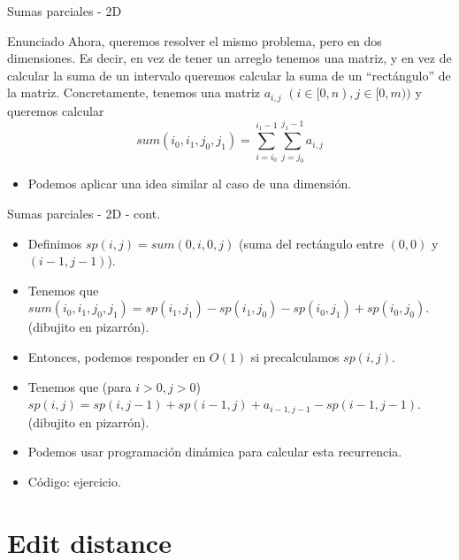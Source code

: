 \documentclass{beamer}
\begin{document}
\begin{frame}{Sumas parciales - 2D}
\begin{block}{Enunciado}
Ahora, queremos resolver el mismo problema, pero en dos dimensiones. Es decir, en vez de tener un arreglo tenemos una matriz, y en vez de calcular la suma de un intervalo queremos calcular la suma de un ``rect\'angulo'' de la matriz. Concretamente, tenemos una matriz $a_{i,j}$ $(i \in [0,n), j \in [0,m))$ y queremos calcular $$sum(i_0,i_1,j_0,j_1) = \sum_{i=i_0}^{i_1-1}\sum_{j=j_0}^{j_1-1} a_{i,j}$$
\end{block}
\begin{itemize}
\item
Podemos aplicar una idea similar al caso de una dimensi\'on.
\end{itemize}
\end{frame}

\begin{frame}{Sumas parciales - 2D - cont.}
\begin{itemize}
\item
Definimos $sp(i,j) = sum(0,i,0,j)$ (suma del rect\'angulo entre $(0,0)$ y $(i-1,j-1)$).
\item
Tenemos que $sum(i_0,i_1,j_0,j_1) = sp(i_1,j_1)-sp(i_1,j_0)-sp(i_0,j_1)+sp(i_0,j_0)$.\\
(dibujito en pizarr\'on).
\item
Entonces, podemos responder en $O(1)$ si precalculamos $sp(i,j)$.
\item
Tenemos que (para $i>0,j>0$) $sp(i,j) = sp(i,j-1)+sp(i-1,j)+a_{i-1,j-1}-sp(i-1,j-1)$.\\
(dibujito en pizarr\'on).
\item
Podemos usar programaci\'on din\'amica para calcular esta recurrencia.
\item
C\'odigo: ejercicio.
\end{itemize}
\end{frame}

\section{Edit distance}
\end{document}
